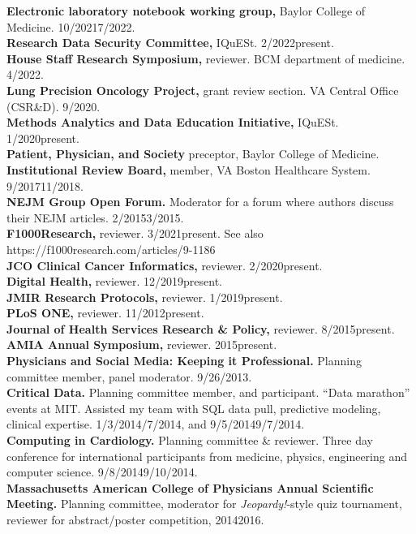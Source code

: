 \documentclass[10pt]{article}
\begin{document}
\textbf{Electronic laboratory notebook working group,} Baylor College
of Medicine. 10/2021\ndash{}7/2022.\\
\textbf{Research Data Security Committee,} IQuESt.
2/2022\ndash{}present.\\
\textbf{House Staff Research Symposium,} reviewer. BCM department of
medicine. 4/2022.\\
\textbf{Lung Precision Oncology Project,} grant review section. VA
Central Office  (CSR\&D). 9/2020.\\
\textbf{Methods Analytics and Data Education Initiative,} IQuESt.
1/2020\ndash{}present.\\
\textbf{Patient, Physician, and Society} preceptor, Baylor College of
Medicine.\\
\textbf{Institutional Review Board,} member, VA Boston Healthcare System.
9/2017\ndash{}11/2018.\\
\textbf{NEJM Group Open Forum.} Moderator for a forum where
authors discuss their NEJM articles. 2/2015\ndash{}3/2015.\\
\textbf{F1000Research,} reviewer. 3/2021\ndash{}present. See also
https://f1000research.com/articles/9-1186\\
\textbf{JCO Clinical Cancer Informatics,} reviewer. 2/2020\ndash{}present.\\
\textbf{Digital Health,} reviewer. 12/2019\ndash{}present.\\
\textbf{JMIR Research Protocols,} reviewer. 1/2019\ndash{}present.\\
\textbf{PLoS ONE,} reviewer. 11/2012\ndash{}present.\\
\textbf{Journal of Health Services Research \& Policy,} reviewer.
8/2015\ndash{}present.\\
\textbf{AMIA Annual Symposium,} reviewer. 2015\ndash{}present.\\
\textbf{Physicians and Social Media: Keeping it Professional.}
Planning committee member, panel moderator. 9/26/2013.\\
\textbf{Critical Data.} Planning committee member, and participant.
``Data marathon'' events at MIT. Assisted my team with SQL data pull,
predictive modeling, clinical expertise.
1/3/2014\ndash{}/7/2014, and 9/5/2014\ndash{}9/7/2014.\\
\textbf{Computing in Cardiology.} Planning committee \& reviewer.
Three day conference for international participants from medicine,
physics, engineering and computer science.
9/8/2014\ndash{}9/10/2014.\\
\textbf{Massachusetts American College of Physicians Annual Scientific
  Meeting.} Planning committee, moderator for \emph{Jeopardy!}-style
quiz tournament, reviewer for abstract/poster competition,
2014\ndash{}2016.
\end{document}
